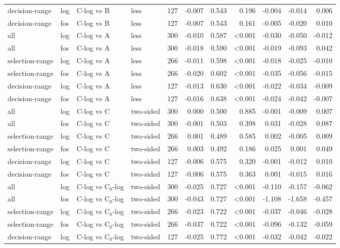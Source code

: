 \begin{longtable}{llllrrrrrrr}
decision-range & log & C-log vs B & less & 127 & -0.007 & 0.543 & 0.196 & -0.004 & -0.014 & 0.006 \\
decision-range & fos & C-log vs B & less & 127 & -0.007 & 0.543 & 0.161 & -0.005 & -0.020 & 0.010 \\
all & log & C-log vs A & less & 300 & -0.010 & 0.587 & <0.001 & -0.030 & -0.050 & -0.012 \\
all & fos & C-log vs A & less & 300 & -0.018 & 0.590 & <0.001 & -0.019 & -0.093 & 0.042 \\
selection-range & log & C-log vs A & less & 266 & -0.011 & 0.598 & <0.001 & -0.018 & -0.025 & -0.010 \\
selection-range & fos & C-log vs A & less & 266 & -0.020 & 0.602 & <0.001 & -0.035 & -0.056 & -0.015 \\
decision-range & log & C-log vs A & less & 127 & -0.013 & 0.630 & <0.001 & -0.022 & -0.034 & -0.009 \\
decision-range & fos & C-log vs A & less & 127 & -0.016 & 0.638 & <0.001 & -0.024 & -0.042 & -0.007 \\
all & log & C-log vs C & two-sided & 300 & 0.000 & 0.500 & 0.885 & -0.001 & -0.009 & 0.007 \\
all & fos & C-log vs C & two-sided & 300 & -0.001 & 0.503 & 0.398 & 0.031 & -0.028 & 0.087 \\
selection-range & log & C-log vs C & two-sided & 266 & 0.001 & 0.489 & 0.585 & 0.002 & -0.005 & 0.009 \\
selection-range & fos & C-log vs C & two-sided & 266 & 0.003 & 0.492 & 0.186 & 0.025 & 0.001 & 0.049 \\
decision-range & log & C-log vs C & two-sided & 127 & -0.006 & 0.575 & 0.320 & -0.001 & -0.012 & 0.010 \\
decision-range & fos & C-log vs C & two-sided & 127 & -0.006 & 0.575 & 0.363 & 0.001 & -0.015 & 0.016 \\
all & log & C-log vs C$_0$-log & two-sided & 300 & -0.025 & 0.727 & <0.001 & -0.110 & -0.157 & -0.062 \\
all & fos & C-log vs C$_0$-log & two-sided & 300 & -0.043 & 0.727 & <0.001 & -1.108 & -1.658 & -0.457 \\
selection-range & log & C-log vs C$_0$-log & two-sided & 266 & -0.023 & 0.722 & <0.001 & -0.037 & -0.046 & -0.028 \\
selection-range & fos & C-log vs C$_0$-log & two-sided & 266 & -0.037 & 0.722 & <0.001 & -0.096 & -0.132 & -0.059 \\
decision-range & log & C-log vs C$_0$-log & two-sided & 127 & -0.025 & 0.772 & <0.001 & -0.032 & -0.042 & -0.022 \\

\end{longtable}
